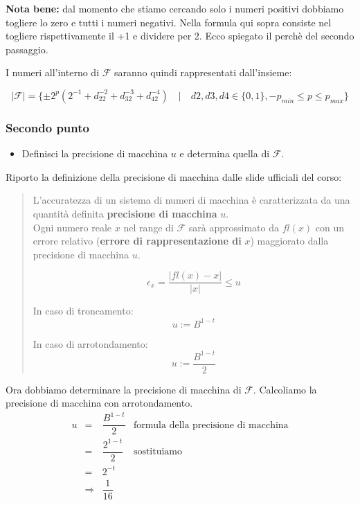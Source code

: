 \textbf{Nota bene:} dal momento che stiamo cercando solo i numeri positivi dobbiamo togliere lo zero e tutti i numeri negativi. Nella formula qui sopra consiste nel togliere rispettivamente il +1 e dividere per 2. Ecco spiegato il perchè del secondo passaggio.

\null

I numeri all'interno di $\mathcal{F}$ saranno quindi rappresentati dall'insieme:

\begin{equation*}
  |\mathcal{F}| = \{ \pm 2^p(2^{-1}+d_22^{-2}+d_32^{-3}+d_42^{-4})\quad|\quad d2, d3, d4 \in \{0,1\}, -p_{min} \leq p \leq p_{max} \}
\end{equation*}


\subsubsection{Secondo punto}
\begin{itemize}
  \item Definisci la precisione di macchina $u$ e determina quella di $\mathcal{F}$.
\end{itemize}
  Riporto la definizione della precisione di macchina dalle slide ufficiali del corso:

  \begin{quote}
    L'accuratezza di un sistema di numeri di macchina è caratterizzata da una quantità definita \textbf{precisione di macchina} $u$.\\

    Ogni numero reale $x$ nel range di $\mathcal{F}$ sarà approssimato da $fl(x)$ con un errore relativo (\textbf{errore di rappresentazione di} $x$) maggiorato dalla precisione di macchina $u$.

    \begin{equation*}
      \epsilon_x = \dfrac{|fl(x) - x|}{|x|} \leq u
    \end{equation*}

    In caso di troncamento:
    \begin{equation*}
      u:= B^{1-t}
    \end{equation*}

    In caso di arrotondamento:
    \begin{equation*}
      u:= \dfrac{B^{1-t}}{2}
    \end{equation*}
  \end{quote}

  Ora dobbiamo determinare la precisione di macchina di $\mathcal{F}$. Calcoliamo la precisione di macchina con arrotondamento.
  \[
  \renewcommand{\arraystretch}{2.0}
  \begin{array}{rclr}
      u & = & \dfrac{B^{1-t}}{2} & \text{formula della precisione di macchina} \\
       & = & \dfrac{2^{1-t}}{2} & \text{sostituiamo} \\
      & = & 2^{-t}\\
      & \Rightarrow & \dfrac{1}{16}\\
  \end{array}
  \]

